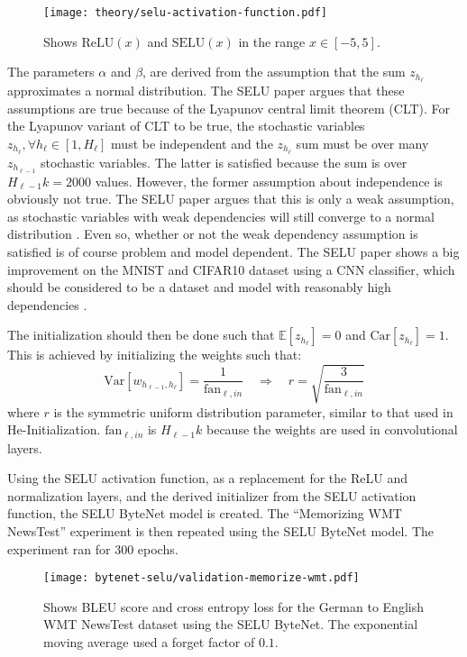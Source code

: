\begin{figure}[h]
    \centering
    \texttt{[image: theory/selu-activation-function.pdf]}
    \caption{Shows $\mathrm{ReLU}(x)$ and $\mathrm{SELU}(x)$ in the range $x \in [-5, 5]$.}
    \label{fig:result:selu-bytenet:bytenet-selu-activation}
\end{figure}

The parameters $\alpha$ and $\beta$, are derived from the assumption that the sum $z_{h_\ell}$ approximates a normal distribution. The SELU paper argues that these assumptions are true because of the Lyapunov central limit theorem (CLT). For the Lyapunov variant of CLT to be true, the stochastic variables $z_{h_\ell}, \forall h_\ell \in [1, H_\ell]$ must be independent and the $z_{h_\ell}$ sum must be over many $z_{h_{\ell-1}}$ stochastic variables. The latter is satisfied because the sum is over $H_{\ell-1} k = 2000$ values. However, the former assumption about independence is obviously not true. The SELU paper argues that this is only a weak assumption, as stochastic variables with weak dependencies will still converge to a normal distribution \cite{selu, weak-clt}. Even so, whether or not the weak dependency assumption is satisfied is of course problem and model dependent. The SELU paper shows a big improvement on the MNIST and CIFAR10 dataset using a CNN classifier, which should be considered to be a dataset and model with reasonably high dependencies \cite{selu}.

The initialization should then be done such that $\mathbb{E}[z_{h_\ell}] = 0$ and $\mathrm{Car}[z_{h_\ell}] = 1$. This is achieved by initializing the weights such that:
\begin{equation}
\mathrm{Var}[w_{h_{\ell-1}, h_{\ell}}] = \frac{1}{\mathrm{fan}_{\ell, in}} \quad \Rightarrow \quad r = \sqrt{\frac{3}{\mathrm{fan}_{\ell, in}}}
\end{equation}
where $r$ is the symmetric uniform distribution parameter, similar to that used in He-Initialization. $\mathrm{fan}_{\ell, in}$ is $H_{\ell-1} k$ because the weights are used in convolutional layers.

Using the SELU activation function, as a replacement for the ReLU and normalization layers, and the derived initializer from the SELU activation function, the SELU ByteNet model is created. The ``Memorizing WMT NewsTest'' experiment is then repeated using the SELU ByteNet model. The experiment ran for 300 epochs.

\begin{figure}[h]
    \centering
    \texttt{[image: bytenet-selu/validation-memorize-wmt.pdf]}
    \caption{Shows BLEU score and cross entropy loss for the German to English WMT NewsTest dataset using the SELU ByteNet. The exponential moving average used a forget factor of $0.1$.}
    \label{fig:result:selu-bytenet:bytenet-selu-wmt}
\end{figure}

